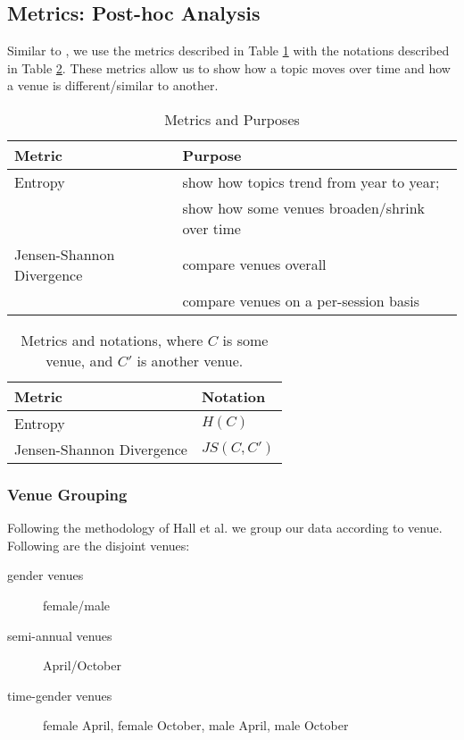 \subsection{Metrics: Post-hoc Analysis}
Similar to \cite{hall-jurafsky-manning:2008:EMNLP}, we use the metrics described in Table \ref{tab:metric_purposes} with the notations described in Table \ref{tab:metric_notation}. These metrics allow us to show how a topic moves over time and how a venue is different/similar to another.

\begin{table}[center]
	\centering
	\begin{tabular} {| l | l |}
		\hline	\textbf{Metric} 			& \textbf{Purpose} \\ \hline
		\hline	Entropy						& show how topics trend from year to year;\\
											& show how some venues broaden/shrink over time	\\
		\hline	Jensen-Shannon Divergence	& compare venues overall \\
											& compare venues on a per-session basis	\\ 
		\hline
	\end{tabular}
	\caption{Metrics and Purposes}
	\label{tab:metric_purposes}
\end{table}

\begin{table}[center]
	\centering
	\begin{tabular} {| l | l |}
		\hline	\textbf{Metric} 			&	\textbf{Notation}	\\ \hline
		\hline	Entropy						&	$H(C)$				\\
		\hline	Jensen-Shannon Divergence	&	$JS(C, C')$			\\ \hline
	\end{tabular}
	\caption{Metrics and notations, where $C$ is some venue, and $C'$ is another venue.}
	\label{tab:metric_notation}
\end{table}

\subsubsection{Venue Grouping}
\label{venues}
Following the methodology of Hall et al. we group our data according to venue. Following are the disjoint venues:

	\begin{description}
		\item [gender venues] female/male
		\item [semi-annual venues] April/October
		\item [time-gender venues] female April, female October, male April, male October
	\end{description}

